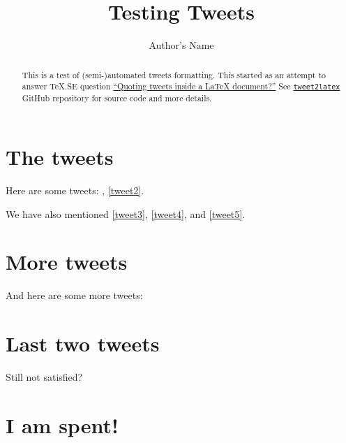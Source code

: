 \documentclass[a4paper,twocolumn]{article}
\newcommand{\inputTweet}[1]{%
  \def\tweetLabel{#1}%
}
\begin{document}
\title{Testing Tweets}
\author{Author's Name}

\maketitle

\begin{abstract}
  This is a test of (semi-)automated tweets formatting. This started as an
  attempt to answer \TeX .SE question
  \href{http://tex.stackexchange.com/q/323562/28495}{``Quoting tweets inside
    a \LaTeX{} document?''} See
  \texttt{\href{https://github.com/wilx/tweet2latex}{tweet2latex}} GitHub
  repository for source code and more details.
\end{abstract}

\section{The tweets}\label{the-tweets}%
Here are some tweets: , \cref{tweet2}.
\inputTweet{tweet1}

\inputTweet{tweet2}

\inputTweet{tweet3}

\inputTweet{tweet4}

\inputTweet{tweet5}

We have also mentioned \cref{tweet3}, \cref{tweet4}, and \cref{tweet5}.

\section{More tweets}\label{more-tweets}%
And here are some more tweets:
\inputTweet{tweet6}

\inputTweet{tweet7}

\inputTweet{tweet8}


\section{Last two tweets}\label{last-two-tweets}%
Still not satisfied?
\inputTweet{tweet10}


\section{I am spent!}\label{i-am-spent}%
\inputTweet{tweet12}

\end{document}
